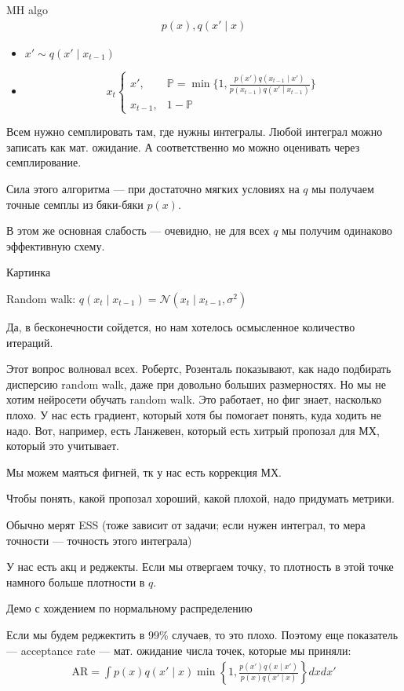 \documentclass{minimal}
\begin{document}
MH algo
\begin{gather*}
    p(x), q(x'\mid x)
\end{gather*}

\begin{itemize}
    \item $x' \sim q(x'\mid x_{t-1})$
    \item
    \[
        x_t
        \begin{cases}
            x', &\mathbb{P}=\min\{1, \frac{p(x')q(x_{t-1}\mid x')}{p(x_{t-1})q(x'\mid x_{t-1})}\}\\
            x_{t-1}, &1-\mathbb{P}
        \end{cases}
    \]
\end{itemize}

Всем нужно семплировать там, где нужны интегралы. Любой интеграл можно записать как мат. ожидание. А соответственно мо можно оценивать через семплирование.

Сила этого алгоритма --- при достаточно мягких условиях на $q$ мы получаем точные семплы из бяки-бяки $p(x)$.

В этом же основная слабость --- очевидно, не для всех $q$ мы получим одинаково эффективную схему.

Картинка

Random walk: $q(x_t\mid x_{t-1})=\mathcal{N}(x_t\mid x_{t-1}, \sigma^2)$

Да, в бесконечности сойдется, но нам хотелось осмысленное количество итераций.

Этот вопрос волновал всех. Робертс, Розенталь показывают, как надо подбирать дисперсию random walk, даже при довольно больших размерностях. Но мы не хотим нейросети обучать random walk. Это работает, но фиг знает, насколько плохо. У нас есть градиент, который хотя бы помогает понять, куда ходить не надо. Вот, например, есть Ланжевен, который есть хитрый пропозал для МХ, который это учитывает.

Мы можем маяться фигней, тк у нас есть коррекция МХ.

Чтобы понять, какой пропозал хороший, какой плохой, надо придумать метрики.

Обычно мерят ESS (тоже зависит от задачи; если нужен интеграл, то мера точности --- точность этого интеграла)

У нас есть акц и реджекты. Если мы отвергаем точку, то плотность в этой точке намного больше плотности в $q$.

Демо с хождением по нормальному распределению

Если мы будем реджектить в 99\% случаев, то это плохо. Поэтому еще показатель --- acceptance rate --- мат. ожидание числа точек, которые мы приняли:
\begin{gather*}
    \mathrm{AR}=\int p(x)q(x'\mid x) \min \left\{1, \frac{p(x')q(x\mid x')}{p(x)q(x'\mid x)}\right\} dx dx'
\end{gather*}
\end{document}
